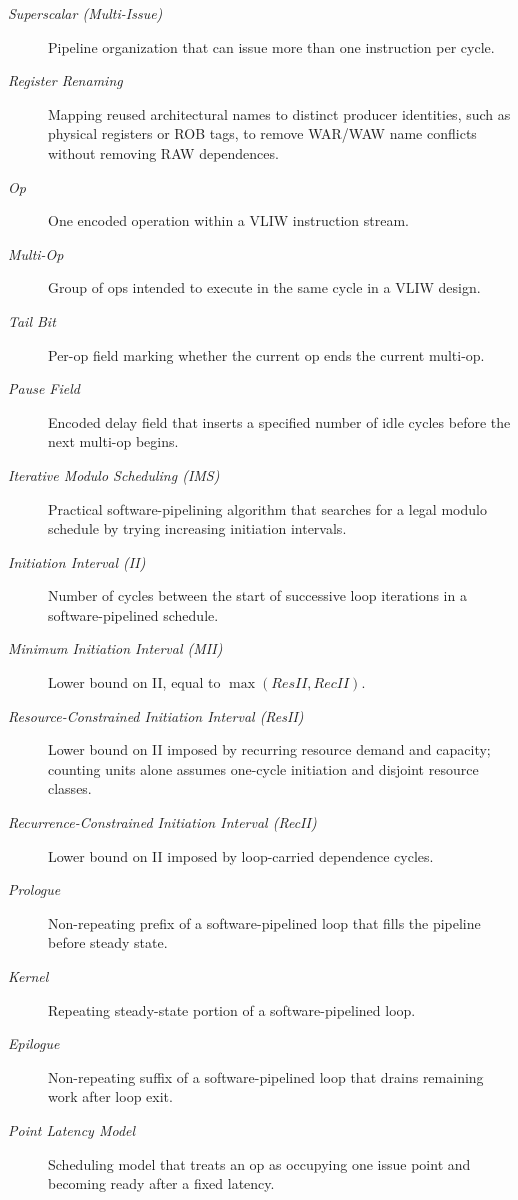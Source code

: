 \begin{description}
    \item[\textit{Superscalar (Multi-Issue)}] Pipeline organization that can issue more than one instruction per cycle.
    \item[\textit{Register Renaming}] Mapping reused architectural names to distinct producer identities, such as physical registers or ROB tags, to remove WAR/WAW name conflicts without removing RAW dependences.
    \item[\textit{Op}] One encoded operation within a VLIW instruction stream.
    \item[\textit{Multi-Op}] Group of ops intended to execute in the same cycle in a VLIW design.
    \item[\textit{Tail Bit}] Per-op field marking whether the current op ends the current multi-op.
    \item[\textit{Pause Field}] Encoded delay field that inserts a specified number of idle cycles before the next multi-op begins.
    \item[\textit{Iterative Modulo Scheduling (IMS)}] Practical software-pipelining algorithm that searches for a legal modulo schedule by trying increasing initiation intervals.
    \item[\textit{Initiation Interval (II)}] Number of cycles between the start of successive loop iterations in a software-pipelined schedule.
    \item[\textit{Minimum Initiation Interval (MII)}] Lower bound on II, equal to $\max(ResII,RecII)$.
    \item[\textit{Resource-Constrained Initiation Interval (ResII)}] Lower bound on II imposed by recurring resource demand and capacity; counting units alone assumes one-cycle initiation and disjoint resource classes.
    \item[\textit{Recurrence-Constrained Initiation Interval (RecII)}] Lower bound on II imposed by loop-carried dependence cycles.
    \item[\textit{Prologue}] Non-repeating prefix of a software-pipelined loop that fills the pipeline before steady state.
    \item[\textit{Kernel}] Repeating steady-state portion of a software-pipelined loop.
    \item[\textit{Epilogue}] Non-repeating suffix of a software-pipelined loop that drains remaining work after loop exit.
    \item[\textit{Point Latency Model}] Scheduling model that treats an op as occupying one issue point and becoming ready after a fixed latency.

\end{description}

